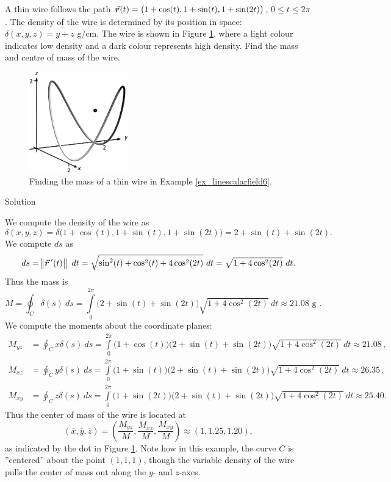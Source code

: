 \begin{example}\label{ex_linescalarfield6}
A thin wire follows the path $\vrt = \left( 1+\cos(t),1+\sin(t), 1+ \sin(2t)\right)$, $0\leq t\leq 2\pi$. The density of the wire is determined by its position in space: $\delta(x,y,z) = y+z$ g/cm. The wire is shown in Figure \ref{fig_Vector_Calc_4}, where a light colour indicates low density and a dark colour represents high density. Find the mass  and centre of mass of the wire.


\begin{figure}[H]
	\begin{center}
			\includegraphics[width=0.38\textwidth]{fig_Vector_Calc_4}
	\caption{Finding the mass of a thin wire in Example \ref{ex_linescalarfield6}.}
	\label{fig_Vector_Calc_4}
	\end{center}
\end{figure}
\vspace*{-0.5cm}
Solution 

We compute the density of the wire as 
$$\delta(x,y,z) = \delta\big(1+\cos(t),1+\sin(t), 1+\sin(2t)\big) = 2+\sin(t)+\sin(2t).$$ We compute $ds$ as
$$ds = \norm{\vrp(t)}\ dt = \sqrt{\sin^2(t)+\cos^2(t)+4\cos^2(2t)}\ dt = \sqrt{1+4\cos^2(2t)}\ dt.$$
Thus the mass is
$$M = \oint_C \delta(s)\ ds = \int\limits_0^{2\pi} \big(2+\sin(t)+\sin(2t)\big)\sqrt{1+4\cos^2(2t)}\ dt \approx 21.08 \text{ g }. $$
We compute the moments about the coordinate planes:%
\begin{align*}
M_{yz} &= \oint_C x\delta(s)\ ds = \int\limits_0^{2\pi}\big(1+\cos(t)\big)\big(2+\sin(t)+\sin(2t)\big)\sqrt{1+4\cos^2(2t)}\ dt \approx 21.08\, , \\
M_{xz} &= \oint_C y\delta(s)\ ds = \int\limits_0^{2\pi}\big(1+\sin(t)\big)\big(2+\sin(t)+\sin(2t)\big)\sqrt{1+4\cos^2(2t)}\ dt \approx
26.35\, ,\\
M_{xy} &= \oint_C z\delta(s)\ ds = \int\limits_0^{2\pi}\big(1+\sin(2 t)\big)\big(2+\sin(t)+\sin(2t)\big)\sqrt{1+4\cos^2(2t)}\ dt \approx 25.40.
\end{align*}%
Thus the center of mass of the wire is located at 
$$(\overline{x},\overline{y},\overline{z}) = \left(\frac{M_{yz}}M, \frac{M_{xz}}M,\frac{M_{xy}}M\right) \approx (1,1.25,1.20),$$
as indicated by the dot in Figure \ref{fig_Vector_Calc_4}. Note how in this example, the curve $C$ is ''centered'' about the point $(1,1,1)$, though the variable density of the wire pulls the center of mass out along the $y$- and $z$-axes.
\end{example}


